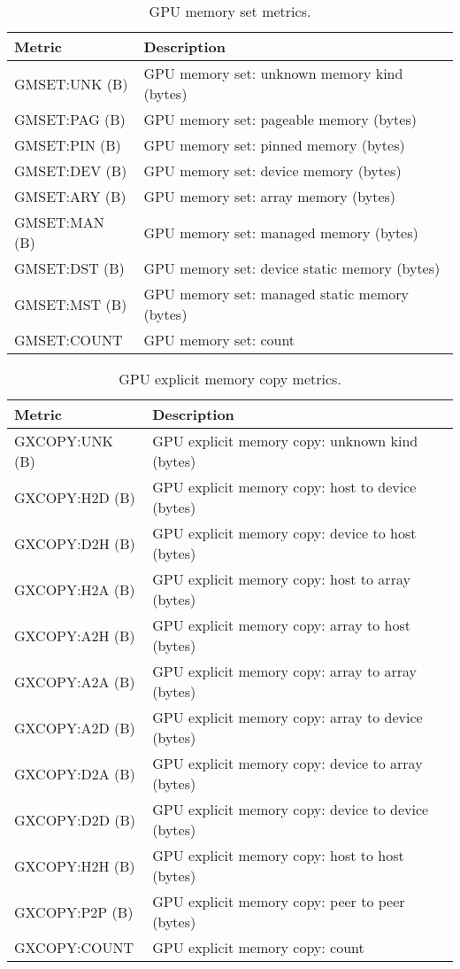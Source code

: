 \begin{table}[t]
\centering
\begin{tabular}{|l|l|}\hline
Metric & Description\\\hline\hline
 GMSET:UNK (B)  &  GPU memory set: unknown memory kind (bytes)  \\\hline
  GMSET:PAG (B)  &  GPU memory set: pageable memory (bytes)  \\\hline
  GMSET:PIN (B)  &  GPU memory set: pinned memory (bytes)  \\\hline
  GMSET:DEV (B)  &  GPU memory set: device memory (bytes)  \\\hline
  GMSET:ARY (B)  &  GPU memory set: array memory (bytes)  \\\hline
  GMSET:MAN (B)  &  GPU memory set: managed memory (bytes)  \\\hline
  GMSET:DST (B)  &  GPU memory set: device static memory (bytes)  \\\hline
  GMSET:MST (B)  &  GPU memory set: managed static memory (bytes)  \\\hline
  GMSET:COUNT  &  GPU memory set: count  \\\hline
\end{tabular}
\caption{GPU memory set metrics.}
\label{table:gmset}
\end{table}

\begin{table}[t]
\centering
\begin{tabular}{|l|l|}\hline
Metric & Description\\\hline\hline
 GXCOPY:UNK (B)  &  GPU explicit memory copy: unknown kind (bytes)  \\\hline 
  GXCOPY:H2D (B)  &  GPU explicit memory copy: host to device (bytes)  \\\hline 
  GXCOPY:D2H (B)  &  GPU explicit memory copy: device to host (bytes)  \\\hline 
  GXCOPY:H2A (B)  &  GPU explicit memory copy: host to array (bytes)  \\\hline 
  GXCOPY:A2H (B)  &  GPU explicit memory copy: array to host (bytes)  \\\hline 
  GXCOPY:A2A (B)  &  GPU explicit memory copy: array to array (bytes)  \\\hline 
  GXCOPY:A2D (B)  &  GPU explicit memory copy: array to device (bytes)  \\\hline 
  GXCOPY:D2A (B)  &  GPU explicit memory copy: device to array (bytes)  \\\hline 
  GXCOPY:D2D (B)  &  GPU explicit memory copy: device to device (bytes)  \\\hline 
  GXCOPY:H2H (B)  &  GPU explicit memory copy: host to host (bytes)  \\\hline 
  GXCOPY:P2P (B)  &  GPU explicit memory copy: peer to peer (bytes)  \\\hline 
  GXCOPY:COUNT  &  GPU explicit memory copy: count  \\\hline 
\end{tabular}
\caption{GPU explicit memory copy metrics.}
\label{table:gxcopy}
\end{table}



